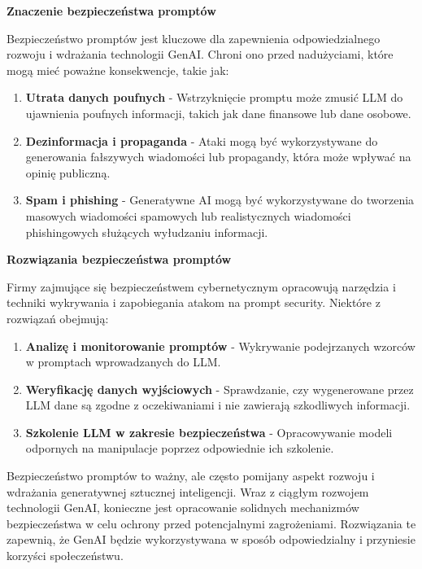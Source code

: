 {\bf Znaczenie bezpieczeństwa promptów}

\noindent Bezpieczeństwo promptów jest kluczowe dla zapewnienia odpowiedzialnego rozwoju i wdrażania technologii GenAI. Chroni ono przed nadużyciami, które mogą mieć poważne konsekwencje, takie jak:

\begin{enumerate}
    \item {\bf Utrata danych poufnych}
    - Wstrzyknięcie promptu może zmusić LLM do ujawnienia poufnych informacji, takich jak dane finansowe lub dane osobowe.
    \item {\bf Dezinformacja i propaganda}
    - Ataki mogą być wykorzystywane do generowania fałszywych wiadomości lub propagandy, która może wpływać na opinię publiczną.
    \item {\bf Spam i phishing}
    - Generatywne AI mogą być wykorzystywane do tworzenia masowych wiadomości spamowych lub realistycznych wiadomości phishingowych służących wyłudzaniu informacji.
\end{enumerate}


{\bf Rozwiązania bezpieczeństwa promptów}

\noindent Firmy zajmujące się bezpieczeństwem cybernetycznym opracowują narzędzia i techniki wykrywania i zapobiegania atakom na prompt security. Niektóre z rozwiązań obejmują:

\begin{enumerate}
    \item {\bf Analizę i monitorowanie promptów} - Wykrywanie podejrzanych wzorców w promptach wprowadzanych do LLM.
    \item {\bf Weryfikację danych wyjściowych} - Sprawdzanie, czy wygenerowane przez LLM dane są zgodne z oczekiwaniami i nie zawierają szkodliwych informacji.
    \item {\bf Szkolenie LLM w zakresie bezpieczeństwa} - Opracowywanie modeli odpornych na manipulacje poprzez odpowiednie ich szkolenie.
\end{enumerate}


\noindent Bezpieczeństwo promptów to ważny, ale często pomijany aspekt rozwoju i wdrażania generatywnej sztucznej inteligencji. Wraz z ciągłym rozwojem technologii GenAI, konieczne jest opracowanie solidnych mechanizmów bezpieczeństwa w celu ochrony przed potencjalnymi zagrożeniami. Rozwiązania te zapewnią, że GenAI będzie wykorzystywana w sposób odpowiedzialny i przyniesie korzyści społeczeństwu.

